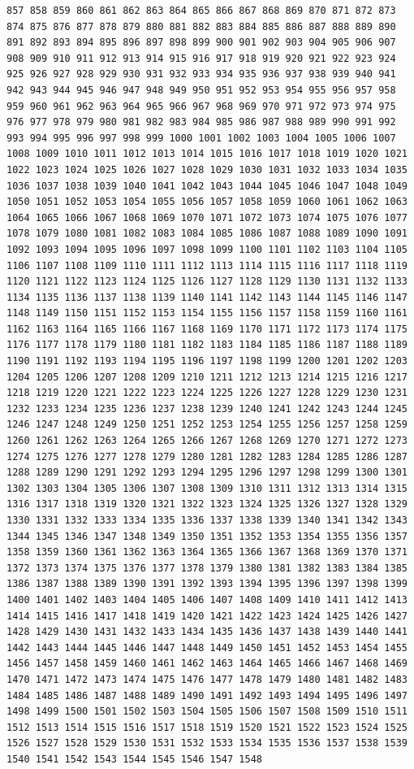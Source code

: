 \documentclass[11pt,]{article}
\begin{document}
\begin{verbatim}
857 858 859 860 861 862 863 864 865 866 867 868 869 870 871 872 873 874 875 876 877 878 879 880 881 882 883 884 885 886 887 888 889 890 891 892 893 894 895 896 897 898 899 900 901 902 903 904 905 906 907 908 909 910 911 912 913 914 915 916 917 918 919 920 921 922 923 924 925 926 927 928 929 930 931 932 933 934 935 936 937 938 939 940 941 942 943 944 945 946 947 948 949 950 951 952 953 954 955 956 957 958 959 960 961 962 963 964 965 966 967 968 969 970 971 972 973 974 975 976 977 978 979 980 981 982 983 984 985 986 987 988 989 990 991 992 993 994 995 996 997 998 999 1000 1001 1002 1003 1004 1005 1006 1007 1008 1009 1010 1011 1012 1013 1014 1015 1016 1017 1018 1019 1020 1021 1022 1023 1024 1025 1026 1027 1028 1029 1030 1031 1032 1033 1034 1035 1036 1037 1038 1039 1040 1041 1042 1043 1044 1045 1046 1047 1048 1049 1050 1051 1052 1053 1054 1055 1056 1057 1058 1059 1060 1061 1062 1063 1064 1065 1066 1067 1068 1069 1070 1071 1072 1073 1074 1075 1076 1077 1078 1079 1080 1081 1082 1083 1084 1085 1086 1087 1088 1089 1090 1091 1092 1093 1094 1095 1096 1097 1098 1099 1100 1101 1102 1103 1104 1105 1106 1107 1108 1109 1110 1111 1112 1113 1114 1115 1116 1117 1118 1119 1120 1121 1122 1123 1124 1125 1126 1127 1128 1129 1130 1131 1132 1133 1134 1135 1136 1137 1138 1139 1140 1141 1142 1143 1144 1145 1146 1147 1148 1149 1150 1151 1152 1153 1154 1155 1156 1157 1158 1159 1160 1161 1162 1163 1164 1165 1166 1167 1168 1169 1170 1171 1172 1173 1174 1175 1176 1177 1178 1179 1180 1181 1182 1183 1184 1185 1186 1187 1188 1189 1190 1191 1192 1193 1194 1195 1196 1197 1198 1199 1200 1201 1202 1203 1204 1205 1206 1207 1208 1209 1210 1211 1212 1213 1214 1215 1216 1217 1218 1219 1220 1221 1222 1223 1224 1225 1226 1227 1228 1229 1230 1231 1232 1233 1234 1235 1236 1237 1238 1239 1240 1241 1242 1243 1244 1245 1246 1247 1248 1249 1250 1251 1252 1253 1254 1255 1256 1257 1258 1259 1260 1261 1262 1263 1264 1265 1266 1267 1268 1269 1270 1271 1272 1273 1274 1275 1276 1277 1278 1279 1280 1281 1282 1283 1284 1285 1286 1287 1288 1289 1290 1291 1292 1293 1294 1295 1296 1297 1298 1299 1300 1301 1302 1303 1304 1305 1306 1307 1308 1309 1310 1311 1312 1313 1314 1315 1316 1317 1318 1319 1320 1321 1322 1323 1324 1325 1326 1327 1328 1329 1330 1331 1332 1333 1334 1335 1336 1337 1338 1339 1340 1341 1342 1343 1344 1345 1346 1347 1348 1349 1350 1351 1352 1353 1354 1355 1356 1357 1358 1359 1360 1361 1362 1363 1364 1365 1366 1367 1368 1369 1370 1371 1372 1373 1374 1375 1376 1377 1378 1379 1380 1381 1382 1383 1384 1385 1386 1387 1388 1389 1390 1391 1392 1393 1394 1395 1396 1397 1398 1399 1400 1401 1402 1403 1404 1405 1406 1407 1408 1409 1410 1411 1412 1413 1414 1415 1416 1417 1418 1419 1420 1421 1422 1423 1424 1425 1426 1427 1428 1429 1430 1431 1432 1433 1434 1435 1436 1437 1438 1439 1440 1441 1442 1443 1444 1445 1446 1447 1448 1449 1450 1451 1452 1453 1454 1455 1456 1457 1458 1459 1460 1461 1462 1463 1464 1465 1466 1467 1468 1469 1470 1471 1472 1473 1474 1475 1476 1477 1478 1479 1480 1481 1482 1483 1484 1485 1486 1487 1488 1489 1490 1491 1492 1493 1494 1495 1496 1497 1498 1499 1500 1501 1502 1503 1504 1505 1506 1507 1508 1509 1510 1511 1512 1513 1514 1515 1516 1517 1518 1519 1520 1521 1522 1523 1524 1525 1526 1527 1528 1529 1530 1531 1532 1533 1534 1535 1536 1537 1538 1539 1540 1541 1542 1543 1544 1545 1546 1547 1548 
\end{verbatim}
\end{document}
